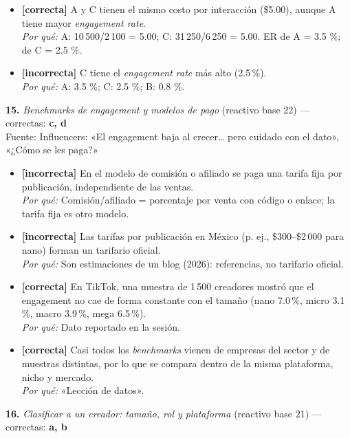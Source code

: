\documentclass[10pt,letterpaper]{article}
\begin{document}
{\begin{itemize}[leftmargin=1.2em,itemsep=0pt,topsep=1pt,parsep=0pt]
\item[\textbf{c)}] {\footnotesize \textbf{[correcta]} A y C tienen el mismo costo por interacción (\$5.00), aunque A tiene mayor \textit{engagement rate}.\\ \textit{Por qué:} A: 10\,500/2\,100 = 5.00; C: 31\,250/6\,250 = 5.00. ER de A = 3.5 \%; de C = 2.5 \%.}
\item[\textbf{d)}] {\footnotesize \textbf{[incorrecta]} C tiene el \textit{engagement rate} más alto (2.5\,\%).\\ \textit{Por qué:} A: 3.5 \%; C: 2.5 \%; B: 0.8 \%.}
\end{itemize}
\vspace{3pt}\noindent\textbf{15.} \textit{Benchmarks de engagement y modelos de pago} (reactivo base 22) — correctas: \textbf{c, d}\\[-1pt]
{\scriptsize Fuente: Influencers: «El engagement baja al crecer… pero cuidado con el dato», «¿Cómo se les paga?»}
\begin{itemize}[leftmargin=1.2em,itemsep=0pt,topsep=1pt,parsep=0pt]
\item[\textbf{a)}] {\footnotesize \textbf{[incorrecta]} En el modelo de comisión o afiliado se paga una tarifa fija por publicación, independiente de las ventas.\\ \textit{Por qué:} Comisión/afiliado = porcentaje por venta con código o enlace; la tarifa fija es otro modelo.}
\item[\textbf{b)}] {\footnotesize \textbf{[incorrecta]} Las tarifas por publicación en México (p. ej., \$300--\$2\,000 para nano) forman un tarifario oficial.\\ \textit{Por qué:} Son estimaciones de un blog (2026): referencias, no tarifario oficial.}
\item[\textbf{c)}] {\footnotesize \textbf{[correcta]} En TikTok, una muestra de 1\,500 creadores mostró que el engagement no cae de forma constante con el tamaño (nano 7.0\,\%, micro 3.1\,\%, macro 3.9\,\%, mega 6.5\,\%).\\ \textit{Por qué:} Dato reportado en la sesión.}
\item[\textbf{d)}] {\footnotesize \textbf{[correcta]} Casi todos los \textit{benchmarks} vienen de empresas del sector y de muestras distintas, por lo que se compara dentro de la misma plataforma, nicho y mercado.\\ \textit{Por qué:} «Lección de datos».}
\end{itemize}
\vspace{3pt}\noindent\textbf{16.} \textit{Clasificar a un creador: tamaño, rol y plataforma} (reactivo base 21) — correctas: \textbf{a, b}\\[-1pt]
}
\end{document}

